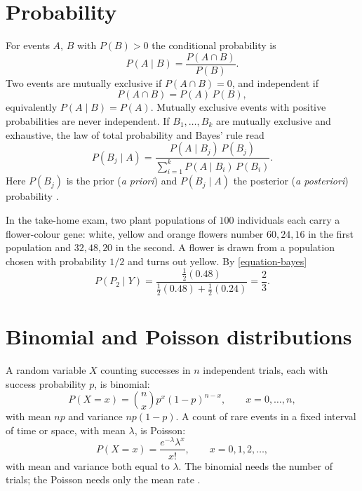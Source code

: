 \section{Probability}
\label{section-probability}

For events $A$, $B$ with $P(B) > 0$ the
conditional probability is
$$
P(A \mid B) =
\frac{P(A \cap B)}{P(B)}.
$$
Two events are mutually exclusive if
$P(A \cap B) = 0$, and independent if
$$
P(A \cap B) = P(A)\,P(B),
$$
equivalently $P(A \mid B) = P(A)$.
Mutually exclusive events with positive
probabilities are never independent. If
$B_1, \dots, B_k$ are mutually exclusive
and exhaustive, the law of total
probability and Bayes' rule read
\begin{equation}
\label{equation-bayes}
P(B_j \mid A) =
\frac{P(A \mid B_j)\,P(B_j)}
{\sum_{i=1}^k P(A \mid B_i)\,P(B_i)}.
\end{equation}
Here $P(B_j)$ is the prior (\emph{a
priori}) and $P(B_j \mid A)$ the
posterior (\emph{a posteriori})
probability
\cite[Sections
3.4--3.7]{rosner2011biostatistics}.

\begin{example}
\label{example-bayes-flowers}
In the take-home exam, two plant
populations of $100$ individuals each
carry a flower-colour gene: white,
yellow and orange flowers number
$60, 24, 16$ in the first population and
$32, 48, 20$ in the second. A flower is
drawn from a population chosen with
probability $1/2$ and turns out yellow.
By \eqref{equation-bayes}
$$
P(P_2 \mid Y) =
\frac{\frac{1}{2}(0.48)}
{\frac{1}{2}(0.48) + \frac{1}{2}(0.24)}
= \frac{2}{3}.
$$
\end{example}

\section{Binomial and Poisson distributions}
\label{section-binomial-poisson}

A random variable $X$ counting successes
in $n$ independent trials, each with
success probability $p$, is binomial:
$$
P(X = x) = \binom{n}{x}
p^x (1-p)^{n-x},
\qquad x = 0, \dots, n,
$$
with mean $np$ and variance $np(1-p)$. A
count of rare events in a fixed interval
of time or space, with mean $\lambda$, is
Poisson:
$$
P(X = x) = \frac{e^{-\lambda}
\lambda^x}{x!},
\qquad x = 0, 1, 2, \dots,
$$
with mean and variance both equal to
$\lambda$. The binomial needs the number
of trials; the Poisson needs only the
mean rate
\cite[Sections
4.8--4.12]{rosner2011biostatistics}.

